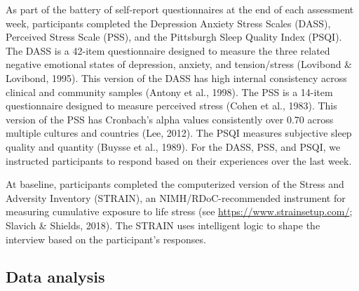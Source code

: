 \documentclass[authordate, empirical,issue]{jote-new-article}
\begin{document}
As part of the battery of self-report questionnaires at the end of each assessment week, participants completed the Depression Anxiety Stress Scales (DASS), Perceived Stress Scale (PSS), and the Pittsburgh Sleep Quality Index (PSQI). The DASS is a 42-item questionnaire designed to measure the three related negative emotional states of depression, anxiety, and tension/stress (Lovibond \& Lovibond, 1995). This version of the DASS has high internal consistency across clinical and community samples (Antony et al., 1998). The PSS is a 14-item questionnaire designed to measure perceived stress (Cohen et al., 1983). This version of the PSS has Cronbach's alpha values consistently over 0.70 across multiple cultures and countries (Lee, 2012). The PSQI measures subjective sleep quality and quantity (Buysse et al., 1989). For the DASS, PSS, and PSQI, we instructed participants to respond based on their experiences over the last week.



At baseline, participants completed the computerized version of the Stress and Adversity Inventory (STRAIN), an NIMH/RDoC-recommended instrument for measuring cumulative exposure to life stress (see \url{https://www.strainsetup.com/}; Slavich \& Shields, 2018). The STRAIN uses intelligent logic to shape the interview based on the participant's responses.






\subsection{Data analysis}
\end{document}
